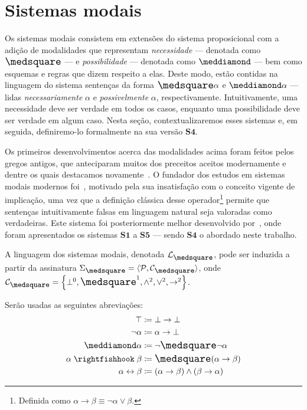\section{Sistemas modais}
    Os sistemas modais consistem em extensões do sistema proposicional com a adição de modalidades que representam \emph{necessidade} --- denotada como $\nec$ --- e \emph{possibilidade} --- denotada como $\pos$ --- bem como esquemas e regras que dizem respeito a elas. Deste modo, estão contidas na linguagem do sistema sentenças da forma $\nec\alpha$ e $\pos\alpha$ --- lidas \emph{necessariamente} $\alpha$ e \emph{possivelmente} $\alpha$, respectivamente. Intuitivamente, uma necessidade deve ser verdade em todos os casos, enquanto uma possibilidade deve ser verdade em algum caso. Nesta seção, contextualizaremos esses sistemas e, em seguida, definiremo-lo formalmente na sua versão $\mathbf{S4}$.

    Os primeiros desenvolvimentos acerca das modalidades acima foram feitos pelos gregos antigos, que anteciparam muitos dos preceitos aceitos modernamente e dentre os quais destacamos novamente~\cite{Aristotle}. O fundador dos estudos em sistemas modais modernos foi~\cite{Lewis}, motivado pela sua insatisfação com o conceito vigente de implicação, uma vez que a definição clássica desse operador\footnote{Definida como $\alpha\to\beta\equiv\neg\alpha\vee\beta$.} permite que sentenças intuitivamente falsas em linguagem natural seja valoradas como verdadeiras. Este sistema foi posteriormente melhor desenvolvido por~\cite{Langford}, onde foram apresentados os sistemas $\mathbf{S1}$ a $\mathbf{S5}$ --- sendo $\mathbf{S4}$ o abordado neste trabalho.

    \begin{definition}
        A linguagem dos sistemas modais, denotada $\mathcal{L}_{\nec}$, pode ser induzida a partir da assinatura $\Sigma_{\nec}=\sequence{\mathcal{P},\mathcal{C}_{\nec}}$, onde $\mathcal{C}_{\nec}=\set{\bot^0,\nec^1,\wedge^2,\vee^2,\to^2}$.
    \end{definition}

    \begin{notation}
        Serão usadas as seguintes abreviações:
        \begin{align*}
            \top&\coloneqq\bot\to\bot\\
            \neg\alpha&\coloneqq\alpha\to\bot\\
            \pos\alpha&\coloneqq\neg\nec\neg\alpha\\
            \alpha\strictif\beta&\coloneqq\nec(\alpha\to\beta)\\
            \alpha\leftrightarrow\beta&\coloneqq(\alpha\to\beta)\wedge(\beta\to\alpha)
        \end{align*}
    \end{notation}

